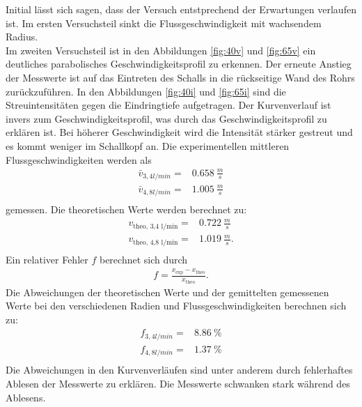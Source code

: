 Initial lässt sich sagen, dass der Versuch entstprechend der Erwartungen verlaufen ist.
Im ersten Versuchsteil sinkt die Flussgeschwindigkeit mit wachsendem Radius.
\\Im zweiten Versuchsteil ist in den Abbildungen \ref{fig:40v} und \ref{fig:65v} ein deutliches parabolisches Geschwindigkeitsprofil zu erkennen.
Der erneute Anstieg der Messwerte ist auf das Eintreten des Schalls in die rückseitige Wand des Rohrs zurückzuführen.
In den Abbildungen \ref{fig:40i} und \ref{fig:65i} sind die Streuintensitäten gegen die Eindringtiefe aufgetragen.
Der Kurvenverlauf ist invers zum Geschwindigkeitsprofil, was durch das Geschwindigkeitsprofil zu erklären ist.
Bei höherer Geschwindigkeit wird die Intensität stärker gestreut und es kommt weniger im Schallkopf an.
Die experimentellen mittleren Flussgeschwindigkeiten werden als
\begin{align*}
  \bar{v}_{3,4 l/min}= & \SI{0.658}{\frac{m}{s}} \\
  \bar{v}_{4,8 l/min}= & \SI{1.005}{\frac{m}{s}} \\
\end{align*}
gemessen.
Die theoretischen Werte werden berechnet zu:
\begin{align*}
  v_{\text{theo, 3,4 l/min}}=& \SI{0,722}{\frac{m}{s}} \\
  v_{\text{theo, 4,8 l/min}}=& \SI{1,019}{\frac{m}{s}}. \\
\end{align*}
Ein relativer Fehler $f$ berechnet sich durch
\begin{align*}
  f=\frac{x_{\text{exp}}-x_{\text{theo}}}{x_{\text{theo}}}.
\end{align*}
Die Abweichungen der theoretischen Werte und der gemittelten gemessenen Werte bei den verschiedenen Radien und Flussgeschwindigkeiten berechnen sich zu:
\begin{align*}
  f_{3,4 l/min}= & \SI{8.86}{\%} \\
  f_{4,8 l/min}= & \SI{1.37}{\%}\\
\end{align*}
Die Abweichungen in den Kurvenverläufen sind unter anderem durch fehlerhaftes Ablesen der Messwerte zu erklären.
Die Messwerte schwanken stark während des Ablesens.
